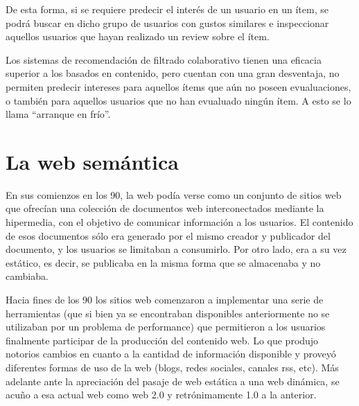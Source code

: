 De esta forma, si se requiere predecir el interés de un usuario en un ítem, se podrá buscar en dicho grupo de usuarios con gustos similares e inspeccionar aquellos usuarios que hayan realizado un review sobre el ítem.

Los sistemas de recomendación de filtrado colaborativo tienen una eficacia superior a los basados en contenido, pero cuentan con una gran desventaja, no permiten predecir intereses para aquellos ítems que aún no poseen evualuaciones, o también para aquellos usuarios que no han evualuado ningún ítem.  A esto se lo llama “arranque en frío”.

\section{La web semántica}
\label{section:la-web-semantica}
En sus comienzos en los 90, la web podía verse como un conjunto de sitios web que ofrecían una colección de documentos web interconectados mediante la hipermedia, con el objetivo de comunicar información a los usuarios.
El contenido de esos documentos sólo era generado por el mismo creador y publicador del documento, y los usuarios se limitaban a consumirlo. Por otro lado, era a su vez estático, es decir, se publicaba en la misma forma que se almacenaba y no cambiaba.  

Hacia fines de los 90 los sitios web comenzaron a implementar una serie de herramientas (que si bien ya se encontraban disponibles anteriormente no se utilizaban por un problema de performance) que permitieron a los usuarios finalmente participar de la producción del contenido web. Lo que produjo notorios cambios en cuanto a la cantidad de información disponible y proveyó diferentes formas de uso de la web (blogs, redes sociales, canales rss, etc). Más adelante ante la apreciación del pasaje de web estática a una web dinámica, se acuño a esa actual web como web 2.0 y retrónimamente 1.0 a la anterior.

